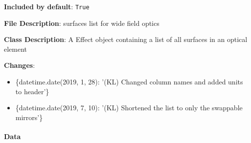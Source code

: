 \documentclass[a4paper]{article}
\newlength{\DUtablewidth} %
\begin{document}
\textbf{Included by default}: \texttt{True}

\textbf{File Description}: surfaces list for wide field optics

\textbf{Class Description}: A Effect object containing a list of all surfaces in an optical element

\textbf{Changes}:

\begin{itemize}
\item \{datetime.date(2019, 1, 28): '(KL) Changed column names and added units to header'\}

\item \{datetime.date(2019, 7, 10): '(KL) Shortened the list to only the swappable mirrors'\}
\end{itemize}


\paragraph{Data%
  \label{id15}%
}
\leavevmode
\setlength{\DUtablewidth}{\linewidth}
\end{document}
